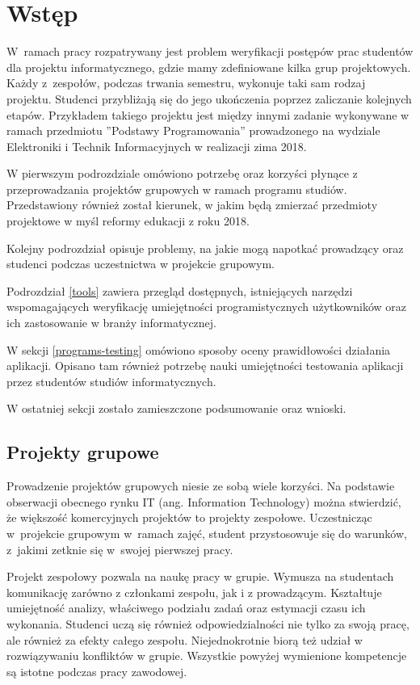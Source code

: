 \chapter{Wstęp}
\label{chapter:intro}

W~ramach pracy rozpatrywany jest problem weryfikacji postępów prac studentów dla projektu informatycznego, gdzie mamy zdefiniowane kilka grup projektowych.
Każdy z~zespołów, podczas trwania semestru, wykonuje taki sam rodzaj projektu.
Studenci przybliżają się do jego ukończenia poprzez zaliczanie kolejnych etapów.
Przykładem takiego projektu jest między innymi zadanie wykonywane w ramach przedmiotu ”Podstawy Programowania” prowadzonego na wydziale Elektroniki i Technik Informacyjnych w realizacji zima 2018.

W pierwszym podrozdziale omówiono potrzebę oraz korzyści płynące z przeprowadzania projektów grupowych w ramach programu studiów.
Przedstawiony również został kierunek, w jakim będą zmierzać przedmioty projektowe w myśl reformy edukacji z roku 2018.

Kolejny podrozdział opisuje problemy, na jakie mogą napotkać prowadzący oraz studenci podczas uczestnictwa w projekcie grupowym.

Podrozdział \ref{tools} zawiera przegląd dostępnych, istniejących narzędzi wspomagających weryfikację umiejętności programistycznych użytkowników oraz ich zastosowanie w branży informatycznej.

W sekcji \ref{programs-testing} omówiono sposoby oceny prawidłowości działania aplikacji.
Opisano tam również potrzebę nauki umiejętności testowania aplikacji przez studentów studiów informatycznych.

W ostatniej sekcji zostało zamieszczone podsumowanie oraz wnioski.

\vfill

\section{Projekty grupowe}

Prowadzenie projektów grupowych niesie ze sobą wiele korzyści.
Na podstawie obserwacji obecnego rynku IT (ang. Information Technology) można stwierdzić, że większość komercyjnych projektów to projekty zespołowe.
Uczestnicząc w~projekcie grupowym w~ramach zajęć, student przystosowuje się do warunków, z~jakimi zetknie się w~swojej pierwszej pracy.

Projekt zespołowy pozwala na naukę pracy w grupie.
Wymusza na studentach komunikację zarówno z członkami zespołu, jak i z prowadzącym.
Kształtuje umiejętność analizy, właściwego podziału zadań oraz estymacji czasu ich wykonania.
Studenci uczą się również odpowiedzialności nie tylko za swoją pracę, ale również za efekty całego zespołu.
Niejednokrotnie biorą też udział w rozwiązywaniu konfliktów w grupie.
Wszystkie powyżej wymienione kompetencje są istotne podczas pracy zawodowej.


